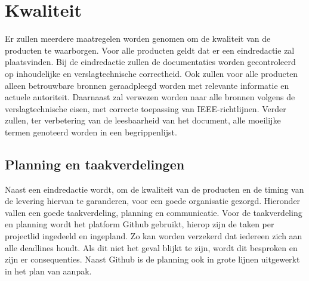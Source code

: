 \section{Kwaliteit}
Er zullen meerdere maatregelen worden genomen om de kwaliteit van de producten te waarborgen. Voor alle producten geldt dat er een eindredactie zal plaatsvinden. Bij de eindredactie zullen de documentaties worden gecontroleerd op inhoudelijke en verslagtechnische correctheid. Ook zullen voor alle producten alleen betrouwbare bronnen geraadpleegd worden met relevante informatie en actuele autoriteit. Daarnaast zal verwezen worden naar alle bronnen volgens de verslagtechnische eisen, met correcte toepassing van IEEE-richtlijnen. Verder zullen, ter verbetering van de leesbaarheid van het document, alle moeilijke termen genoteerd worden in een begrippenlijst.

\subsection{Planning en taakverdelingen}
Naast een eindredactie wordt, om de kwaliteit van de producten en de timing van de levering hiervan te garanderen, voor een goede organisatie gezorgd. Hieronder vallen een goede taakverdeling, planning en communicatie. Voor de taakverdeling en planning wordt het platform Github gebruikt, hierop zijn de taken per projectlid ingedeeld en ingepland. Zo kan worden verzekerd dat iedereen zich aan alle deadlines houdt. Als dit niet het geval blijkt te zijn, wordt dit besproken en zijn er consequenties. Naast Github is de planning ook in grote lijnen uitgewerkt in het plan van aanpak. 

